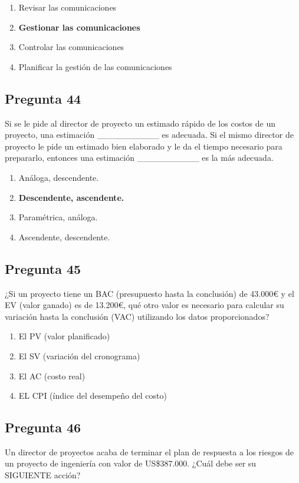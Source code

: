 \documentclass[11pt,a4paper]{article}
\begin{document}
\begin{enumerate}[label=\alph*)]
  \item Revisar las comunicaciones
  \item \textbf{Gestionar las comunicaciones}
  \item Controlar las comunicaciones
  \item Planificar la gestión de las comunicaciones
\end{enumerate}

\subsection*{Pregunta 44}
Si se le pide al director de proyecto un estimado rápido de los costos de un proyecto, una estimación \_\_\_\_\_\_\_\_\_\_ es adecuada. Si el mismo director de proyecto le pide un estimado bien elaborado y le da el tiempo necesario para prepararlo, entonces una estimación \_\_\_\_\_\_\_\_\_\_ es la más adecuada.

\begin{enumerate}[label=\alph*)]
  \item Análoga, descendente.
  \item \textbf{Descendente, ascendente.}
  \item Paramétrica, análoga.
  \item Ascendente, descendente.
\end{enumerate}

\subsection*{Pregunta 45}
¿Si un proyecto tiene un BAC (presupuesto hasta la conclusión) de 43.000€ y el EV (valor ganado) es de 13.200€, qué otro valor es necesario para calcular su variación hasta la conclusión (VAC) utilizando los datos proporcionados?

\begin{enumerate}[label=\alph*)]
  \item El PV (valor planificado)
  \item El SV (variación del cronograma)
  \item El AC (costo real)
  \item EL CPI (índice del desempeño del costo)
\end{enumerate}

\subsection*{Pregunta 46}
Un director de proyectos acaba de terminar el plan de respuesta a los riesgos de un proyecto de ingeniería con valor de US\$387.000. ¿Cuál debe ser su SIGUIENTE acción?
\end{document}
